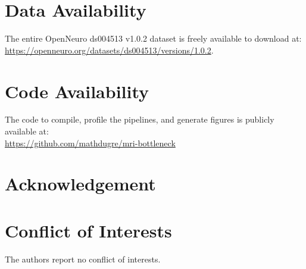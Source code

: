 \documentclass[conference]{IEEEtran}
\begin{document}
\section{Data Availability}
\label{sec:data-availability}
The entire OpenNeuro ds004513 v1.0.2 dataset is freely available to download at:
\\\href{https://openneuro.org/datasets/ds004513/versions/1.0.2}{https://openneuro.org/datasets/ds004513/versions/1.0.2}.
										
\section{Code Availability}
\label{sec:code-availability}
The code to compile, profile the pipelines, and generate figures is publicly available at:
\\\href{https://github.com/mathdugre/mri-bottleneck}{https://github.com/mathdugre/mri-bottleneck}
										
\section*{Acknowledgement}
										
\section*{Conflict of Interests}
The authors report no conflict of interests.
										

% 

										
\newpage
\onecolumn
\end{document}
